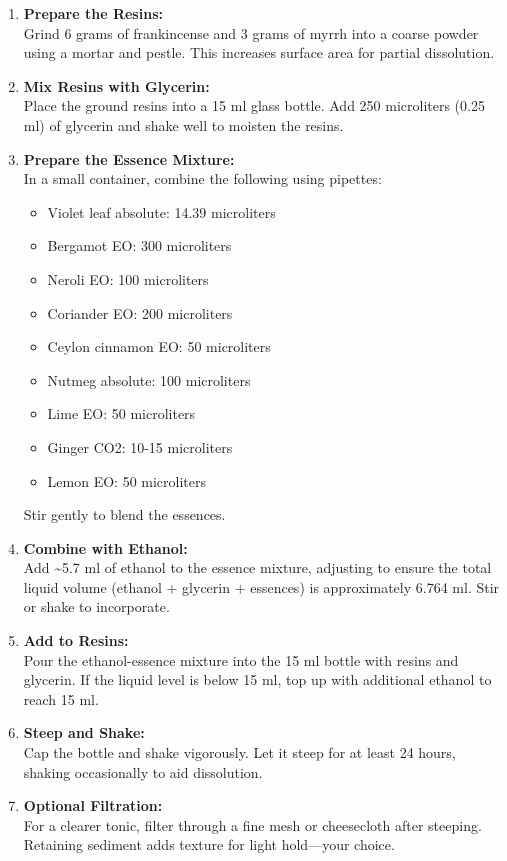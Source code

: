 \documentclass{article}
\begin{document}
\begin{enumerate}[leftmargin=*]
\item \textbf{Prepare the Resins:}\\
   Grind 6 grams of frankincense and 3 grams of myrrh into a coarse powder using a mortar and pestle. This increases surface area for partial dissolution.

\item \textbf{Mix Resins with Glycerin:}\\
   Place the ground resins into a 15 ml glass bottle. Add 250 microliters (0.25 ml) of glycerin and shake well to moisten the resins.

\item \textbf{Prepare the Essence Mixture:}\\
   In a small container, combine the following using pipettes:
   \begin{itemize}
     \item Violet leaf absolute: 14.39 microliters
     \item Bergamot EO: 300 microliters
     \item Neroli EO: 100 microliters
     \item Coriander EO: 200 microliters
     \item Ceylon cinnamon EO: 50 microliters
     \item Nutmeg absolute: 100 microliters
     \item Lime EO: 50 microliters
     \item Ginger CO2: 10-15 microliters
     \item Lemon EO: 50 microliters
   \end{itemize}
   Stir gently to blend the essences.

\item \textbf{Combine with Ethanol:}\\
   Add \textasciitilde{}5.7 ml of ethanol to the essence mixture, adjusting to ensure the total liquid volume (ethanol + glycerin + essences) is approximately 6.764 ml. Stir or shake to incorporate.

\item \textbf{Add to Resins:}\\
   Pour the ethanol-essence mixture into the 15 ml bottle with resins and glycerin. If the liquid level is below 15 ml, top up with additional ethanol to reach 15 ml.

\item \textbf{Steep and Shake:}\\
   Cap the bottle and shake vigorously. Let it steep for at least 24 hours, shaking occasionally to aid dissolution.

\item \textbf{Optional Filtration:}\\
   For a clearer tonic, filter through a fine mesh or cheesecloth after steeping. Retaining sediment adds texture for light hold—your choice.
\end{enumerate}
\end{document}
